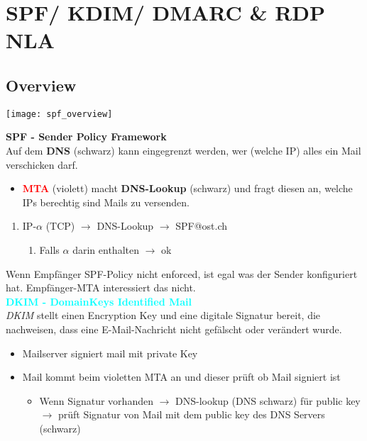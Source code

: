 

\section{SPF/ KDIM/ DMARC \& RDP NLA}

\subsection{Overview}
\begin{center}
    \texttt{[image: spf\_overview]}
\end{center}

\textbf{SPF - Sender Policy Framework}\\
Auf dem \textbf{DNS} (schwarz) kann eingegrenzt werden, wer (welche IP) alles ein Mail verschicken darf.\\
\begin{itemize}
    \item \textcolor{red}{\textbf{MTA}} (violett) macht \textbf{DNS-Lookup} (schwarz) und fragt diesen an, welche IPs berechtig sind Mails zu versenden.\\
\end{itemize}
\begin{enumerate}
    \item IP-$\alpha$ (TCP) $\rightarrow$ DNS-Lookup $\rightarrow$ SPF@ost.ch
    \begin{enumerate}
        \item Falls $\alpha$ darin enthalten $\rightarrow$ ok\\
    \end{enumerate}
\end{enumerate}

Wenn Empfänger SPF-Policy nicht enforced, ist egal was der Sender konfiguriert hat. Empfänger-MTA interessiert das nicht.\\

\textcolor{cyan}{\textbf{DKIM - DomainKeys Identified Mail}}\\
\textit{DKIM} stellt einen Encryption Key und eine digitale Signatur bereit, die nachweisen, dass eine E-Mail-Nachricht nicht gefälscht oder verändert wurde.\\
\begin{itemize}
    \item Mailserver signiert mail mit private Key
    \item Mail kommt beim violetten MTA an und dieser prüft ob Mail signiert ist
    \begin{itemize}
        \item Wenn Signatur vorhanden $\rightarrow$ DNS-lookup (DNS schwarz) für public key $\rightarrow$ prüft Signatur von Mail mit dem public key des DNS Servers (schwarz)\\
    \end{itemize}
\end{itemize}

